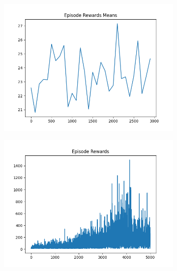 \begin{figure}[H]
    \centering
    \begin{subfigure}{.47\linewidth}
        \centering
        \includegraphics[width=\textwidth]{pole/2024-06-13_18-59-17_dqn_cartpole_episode_rewards_means.png}
    \end{subfigure}
    \begin{subfigure}{.47\linewidth}
        \centering
        \includegraphics[width=\textwidth]{pole/2024-06-13_22-34-12_dqn_cartpole_episode_rewards.png}
    \end{subfigure}
    \begin{subfigure}{.47\linewidth}
        \centering

\end{subfigure}
\end{figure}
